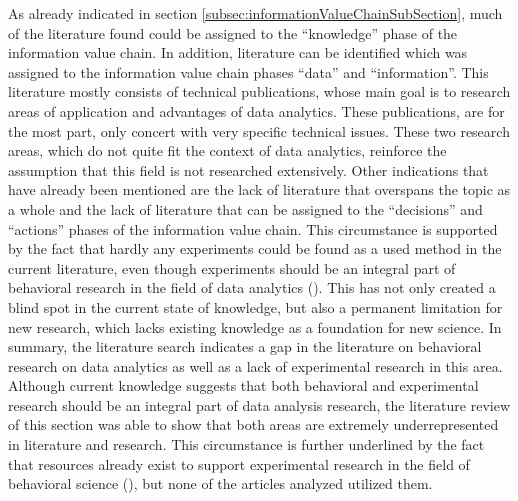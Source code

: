As already indicated in section \ref{subsec:informationValueChainSubSection}, much of the literature found could be assigned to the \enquote{knowledge} phase of the information value chain. %
In addition, literature can be identified which was assigned to the information value chain phases \enquote{data} and \enquote{information}. This literature mostly consists of technical publications, whose main goal is to research areas of application and advantages of data analytics. These publications, are for the most part, only concert with very specific technical issues. These two research areas, which do not quite fit the context of data analytics, reinforce the assumption that this field is not researched extensively. Other indications that have already been mentioned are the lack of literature that overspans the topic as a whole and the lack of literature that can be assigned to the \enquote{decisions} and \enquote{actions} phases of the information value chain. This circumstance is supported by the fact that hardly any experiments could be found as a used method in the current literature, even though experiments should be an integral part of behavioral research in the field of data analytics (\cite{Gniewosz.2011}). This has not only created a blind spot in the current state of knowledge, but also a permanent limitation for new research, which lacks existing knowledge as a foundation for new science. %
In summary, the literature search indicates a gap in the literature on behavioral research on data analytics as well as a lack of experimental research in this area. Although current knowledge suggests that both behavioral and experimental research should be an integral part of data analysis research, the literature review of this section was able to show that both areas are extremely underrepresented in literature and research. This circumstance is further underlined by the fact that resources already exist to support experimental research in the field of behavioral science (\cite{Columbia.2023}), but none of the articles analyzed utilized them. 

